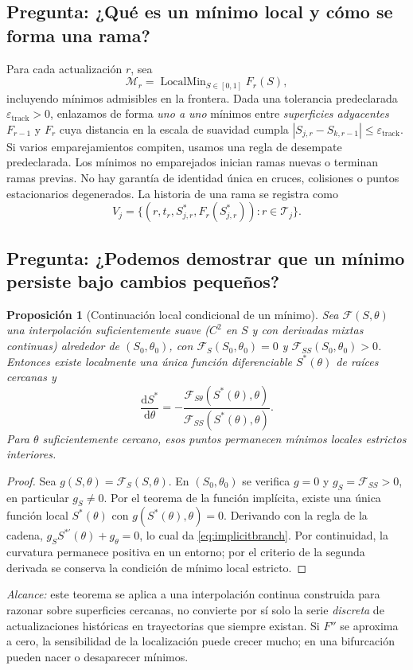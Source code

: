 \documentclass[11pt,letterpaper,parskip=half,headings=small]{scrartcl}
\newtheorem{proposicion}{Proposición}[section]
\theoremstyle{definition}\newtheorem{definicion}[proposicion]{Definición}
\theoremstyle{remark}\newtheorem{observacion}[proposicion]{Observación}
\newcommand{\pregunta}[1]{\subsection{Pregunta: #1}}
\begin{document}
\pregunta{¿Qué es un mínimo local y cómo se forma una rama?}
Para cada actualización $r$, sea
\[
\mathcal M_r=\operatorname{LocalMin}_{S\in[0,1]}F_r(S),
\]
incluyendo mínimos admisibles en la frontera. Dada una tolerancia
predeclarada $\varepsilon_{\mathrm{track}}>0$, enlazamos de forma
\emph{uno a uno} mínimos entre \emph{superficies adyacentes}
$F_{r-1}$ y $F_r$ cuya distancia en la escala de suavidad cumpla
$|S_{j,r}-S_{k,r-1}|\le\varepsilon_{\mathrm{track}}$.
Si varios emparejamientos compiten, usamos una regla de desempate
predeclarada. Los mínimos no emparejados inician ramas nuevas o terminan
ramas previas. No hay garantía de identidad única en cruces,
colisiones o puntos estacionarios degenerados.
La historia de una rama se registra como
\[
V_j=\{(r,t_r,S^*_{j,r},F_r(S^*_{j,r})):r\in\mathcal T_j\}.
\]

\pregunta{¿Podemos demostrar que un mínimo persiste bajo cambios pequeños?}
\begin{proposicion}[Continuación local condicional de un mínimo]\label{prop:branchimplicit}
Sea $\mathcal F(S,\theta)$ una interpolación suficientemente suave
($C^2$ en $S$ y con derivadas mixtas continuas) alrededor de
$(S_0,\theta_0)$, con
$\mathcal F_S(S_0,\theta_0)=0$ y
$\mathcal F_{SS}(S_0,\theta_0)>0$.
Entonces existe localmente una única función diferenciable
$S^*(\theta)$ de raíces cercanas y
\begin{equation}\label{eq:implicitbranch}
\boxed{\frac{\mathrm dS^*}{\mathrm d\theta}
=-\frac{\mathcal F_{S\theta}(S^*(\theta),\theta)}
{\mathcal F_{SS}(S^*(\theta),\theta)}.}
\end{equation}
Para $\theta$ suficientemente cercano, esos puntos permanecen mínimos
locales estrictos interiores.
\end{proposicion}
\begin{proof}
Sea $g(S,\theta)=\mathcal F_S(S,\theta)$.
En $(S_0,\theta_0)$ se verifica $g=0$ y
$g_S=\mathcal F_{SS}>0$, en particular $g_S\ne0$.
Por el teorema de la función implícita, existe una única función
local $S^*(\theta)$ con $g(S^*(\theta),\theta)=0$.
Derivando con la regla de la cadena,
$g_SS^{*\prime}(\theta)+g_\theta=0$,
lo cual da \eqref{eq:implicitbranch}. Por continuidad, la curvatura
permanece positiva en un entorno; por el criterio de la segunda derivada
se conserva la condición de mínimo local estricto.
\end{proof}
\emph{Alcance:} este teorema se aplica a una interpolación continua
construida para razonar sobre superficies cercanas, no convierte por
sí solo la serie \emph{discreta} de actualizaciones históricas en
trayectorias que siempre existan. Si $F''$ se aproxima a cero,
la sensibilidad de la localización puede crecer mucho; en una
bifurcación pueden nacer o desaparecer mínimos.
\end{document}
